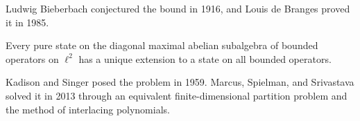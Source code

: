     \begin{remark}
        Ludwig Bieberbach conjectured the bound in 1916, and Louis de Branges
        proved it in 1985.
    \end{remark}

    \begin{theorem}
        Every pure state on the diagonal maximal abelian subalgebra of
        bounded operators on $\ell^2$ has a unique extension to a state on all
        bounded operators.
    \end{theorem}

    \begin{remark}
        Kadison and Singer posed the problem in 1959. Marcus, Spielman, and
        Srivastava solved it in 2013 through an equivalent finite-dimensional
        partition problem and the method of interlacing polynomials.
    \end{remark}
